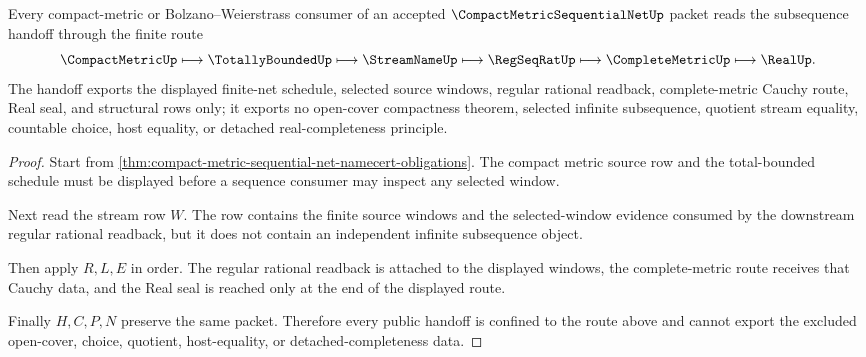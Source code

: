 \begin{theorem}
\label{thm:compact-metric-sequential-net-subsequence-handoff}
Every compact-metric or Bolzano--Weierstrass consumer of an accepted $\CompactMetricSequentialNetUp$ packet reads the subsequence handoff through the finite route
$$
\CompactMetricUp \longmapsto \TotallyBoundedUp \longmapsto \StreamNameUp \longmapsto \RegSeqRatUp \longmapsto \CompleteMetricUp \longmapsto \RealUp .
$$
The handoff exports the displayed finite-net schedule, selected source windows, regular rational readback, complete-metric Cauchy route, Real seal, and structural rows only; it exports no open-cover compactness theorem, selected infinite subsequence, quotient stream equality, countable choice, host equality, or detached real-completeness principle.
\end{theorem}
\begin{proof}
Start from \autoref{thm:compact-metric-sequential-net-namecert-obligations}. The compact metric source row and the total-bounded schedule must be displayed before a sequence consumer may inspect any selected window.

Next read the stream row $W$. The row contains the finite source windows and the selected-window evidence consumed by the downstream regular rational readback, but it does not contain an independent infinite subsequence object.

Then apply $R,L,E$ in order. The regular rational readback is attached to the displayed windows, the complete-metric route receives that Cauchy data, and the Real seal is reached only at the end of the displayed route.

Finally $H,C,P,N$ preserve the same packet. Therefore every public handoff is confined to the route above and cannot export the excluded open-cover, choice, quotient, host-equality, or detached-completeness data.
\end{proof}


